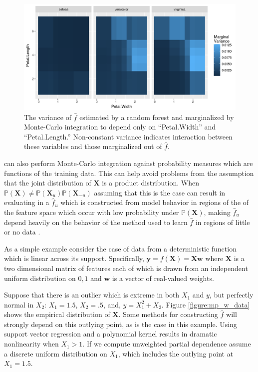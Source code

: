 \begin{figure}
  \includegraphics[width=\textwidth]{mp_int_var.png}
  \caption{The variance of $\hat{f}$ estimated by a random forest and marginalized by Monte-Carlo integration to depend only on ``Petal.Width'' and ``Petal.Length.'' Non-constant variance indicates interaction between these variables and those marginalized out of $\hat{f}$. \label{figure:mp_int_var}}
\end{figure}

 can also perform Monte-Carlo integration against probability measures which are functions of the training data. This can help avoid problems from the assumption that the joint distribution of $\mathbf{X}$ is a product distribution. When $\mathbb{P}(\mathbf{X}) \neq \mathbb{P}(\mathbf{X}_u)\mathbb{P}(\mathbf{X}_{-u})$ assuming that this is the case can result in evaluating in a $\hat{f}_u$ which is constructed from model behavior in regions of the of the feature space which occur with low probability under $\mathbb{P}(\mathbf{X})$, making $\hat{f}_u$ depend heavily on the behavior of the method used to learn $\hat{f}$ in regions of little or no data \citep{hooker2012generalized}.

As a simple example consider the case of data from a deterministic function which is linear across its support. Specifically, $\mathbf{y} = f(\mathbf{X}) = \mathbf{X} \mathbf{w}$ where $\mathbf{X}$ is a two dimensional matrix of features each of which is drawn from an independent uniform distribution on ${0, 1}$ and $\mathbf{w}$ is a vector of real-valued weights.

Suppose that there is an outlier which is extreme in both $X_1$ and $y$, but perfectly normal in $X_2$: $X_1 = 1.5$, $X_2 = .5$, and, $y = X_1^2 + X_2$. Figure \ref{figure:mp_w_data} shows the empirical distribution of $\mathbf{X}$. Some methods for constructing $\hat{f}$ will strongly depend on this outlying point, as is the case in this example. Using support vector regression and a polynomial kernel results in dramatic nonlinearity when $X_1 > 1$. If we compute unweighted partial dependence assume a discrete uniform distribution on $X_1$, which includes the outlying point at $X_1 = 1.5$.

